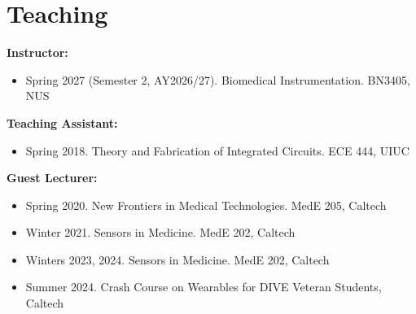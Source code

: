 \documentclass[11pt,a4paper]{article}
\begin{document}
\section{Teaching}
\textbf{Instructor:}
\begin{itemize}[leftmargin=*, itemsep=2pt, parsep=0pt, topsep=2pt]
  \item Spring 2027 (Semester 2, AY2026/27). Biomedical Instrumentation. BN3405, NUS
\end{itemize}
\vspace{6pt}
\textbf{Teaching Assistant:}
\begin{itemize}[leftmargin=*, itemsep=2pt, parsep=0pt, topsep=2pt]
  \item Spring 2018. Theory and Fabrication of Integrated Circuits. ECE 444, UIUC
\end{itemize}
\textbf{Guest Lecturer:}
\begin{itemize}[leftmargin=*, itemsep=2pt, parsep=0pt, topsep=2pt]
  \item Spring 2020. New Frontiers in Medical Technologies. MedE 205, Caltech
  \item Winter 2021. Sensors in Medicine. MedE 202, Caltech
  \item Winters 2023, 2024. Sensors in Medicine. MedE 202, Caltech
  \item Summer 2024. Crash Course on Wearables for DIVE Veteran Students, Caltech
\end{itemize}
\end{document}
